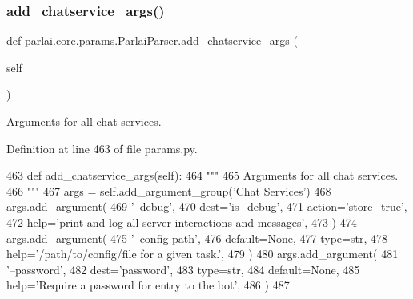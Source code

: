 \subsubsection{\texorpdfstring{add\+\_\+chatservice\+\_\+args()}{add\_chatservice\_args()}}
{\footnotesize\ttfamily def parlai.\+core.\+params.\+Parlai\+Parser.\+add\+\_\+chatservice\+\_\+args (\begin{DoxyParamCaption}\item[{}]{self }\end{DoxyParamCaption})}

\begin{DoxyVerb}Arguments for all chat services.
\end{DoxyVerb}
 

Definition at line 463 of file params.\+py.


\begin{DoxyCode}
463     \textcolor{keyword}{def }add\_chatservice\_args(self):
464         \textcolor{stringliteral}{"""}
465 \textcolor{stringliteral}{        Arguments for all chat services.}
466 \textcolor{stringliteral}{        """}
467         args = self.add\_argument\_group(\textcolor{stringliteral}{'Chat Services'})
468         args.add\_argument(
469             \textcolor{stringliteral}{'--debug'},
470             dest=\textcolor{stringliteral}{'is\_debug'},
471             action=\textcolor{stringliteral}{'store\_true'},
472             help=\textcolor{stringliteral}{'print and log all server interactions and messages'},
473         )
474         args.add\_argument(
475             \textcolor{stringliteral}{'--config-path'},
476             default=\textcolor{keywordtype}{None},
477             type=str,
478             help=\textcolor{stringliteral}{'/path/to/config/file for a given task.'},
479         )
480         args.add\_argument(
481             \textcolor{stringliteral}{'--password'},
482             dest=\textcolor{stringliteral}{'password'},
483             type=str,
484             default=\textcolor{keywordtype}{None},
485             help=\textcolor{stringliteral}{'Require a password for entry to the bot'},
486         )
487 
\end{DoxyCode}
\mbox{\label{classparlai_1_1core_1_1params_1_1ParlaiParser_a718f9802eec8bcac25866900d2ae69b0}} 
